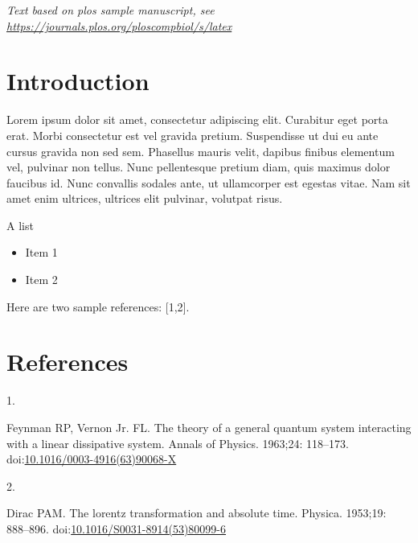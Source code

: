\documentclass[10pt,letterpaper]{article}
\providecommand{\tightlist}{%
  \setlength{\itemsep}{0pt}\setlength{\parskip}{0pt}}
\newlength{\cslhangindent}
\newlength{\csllabelwidth}
\newlength{\cslentryspacingunit} %
\newenvironment{CSLReferences}[2] %
 {%
  \setlength{\parindent}{0pt}
  \ifodd #1
  \let\oldpar\par
  \def\par{\hangindent=\cslhangindent\oldpar}
  \fi
  \setlength{\parskip}{#2\cslentryspacingunit}
 }%
 {}
\newcommand{\CSLLeftMargin}[1]{\parbox[t]{\csllabelwidth}{#1}}
\newcommand{\CSLRightInline}[1]{\parbox[t]{\linewidth - \csllabelwidth}{#1}\break}
\begin{document}
\linenumbers

\emph{Text based on plos sample manuscript, see
\url{https://journals.plos.org/ploscompbiol/s/latex}}

\hypertarget{introduction}{%
\section{Introduction}\label{introduction}}

Lorem ipsum dolor sit amet, consectetur adipiscing elit. Curabitur eget
porta erat. Morbi consectetur est vel gravida pretium. Suspendisse ut
dui eu ante cursus gravida non sed sem. Phasellus mauris velit, dapibus
finibus elementum vel, pulvinar non tellus. Nunc pellentesque pretium
diam, quis maximus dolor faucibus id. Nunc convallis sodales ante, ut
ullamcorper est egestas vitae. Nam sit amet enim ultrices, ultrices elit
pulvinar, volutpat risus.

A list

\begin{itemize}
\tightlist
\item
  Item 1
\item
  Item 2
\end{itemize}

Here are two sample references: {[}1,2{]}.

\hypertarget{references}{%
\section*{References}\label{references}}

\hypertarget{refs}{}
\begin{CSLReferences}{0}{0}
\leavevmode{}%
\CSLLeftMargin{1. }%
\CSLRightInline{Feynman RP, Vernon Jr. FL. The theory of a general
quantum system interacting with a linear dissipative system. Annals of
Physics. 1963;24: 118--173.
doi:\href{https://doi.org/10.1016/0003-4916(63)90068-X}{10.1016/0003-4916(63)90068-X}}

\leavevmode{}%
\CSLLeftMargin{2. }%
\CSLRightInline{Dirac PAM. The lorentz transformation and absolute time.
Physica. 1953;19: 888--896.
doi:\href{https://doi.org/10.1016/S0031-8914(53)80099-6}{10.1016/S0031-8914(53)80099-6}}

\end{CSLReferences}

\nolinenumbers
\end{document}
